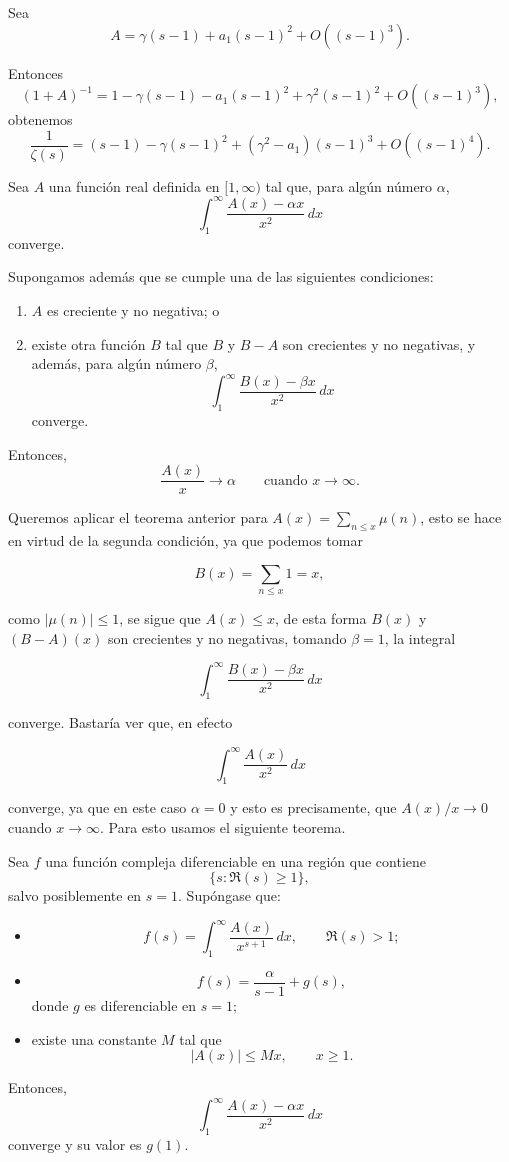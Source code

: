 \documentclass[12pt, a4paper]{article}
\begin{document}
Sea
$$
A=\gamma(s-1)+a_1(s-1)^2+O((s-1)^3).
$$

Entonces
$$
(1+A)^{-1}
=
1-\gamma(s-1)-a_1(s-1)^2+\gamma^2(s-1)^2+O((s-1)^3),
$$
obtenemos
\begin{equation}
    \frac{1}{\zeta(s)}
=
(s-1)-\gamma(s-1)^2+(\gamma^2-a_1)(s-1)^3+O((s-1)^4).
\end{equation}
\begin{theorem}
Sea $A$ una función real definida en $[1,\infty)$ tal que, para algún número $\alpha$,
\[
\int_{1}^{\infty} \frac{A(x)-\alpha x}{x^{2}}\,dx
\]
converge.

Supongamos además que se cumple una de las siguientes condiciones:
\begin{enumerate}
  \item[(i)] $A$ es creciente y no negativa; o
  \item[(ii)] existe otra función $B$ tal que $B$ y $B-A$ son crecientes y no negativas, y además, para algún número $\beta$,
  \[
  \int_{1}^{\infty} \frac{B(x)-\beta x}{x^{2}}\,dx
  \]
  converge.
\end{enumerate}

Entonces,
\[
\frac{A(x)}{x} \longrightarrow \alpha
\qquad \text{cuando } x \to \infty.
\]
\end{theorem}

Queremos aplicar el teorema anterior para $A(x)=\sum_{n\leq x} \mu(n)$, esto se hace en virtud de la segunda condición, ya que podemos tomar

$$B(x)=\sum_{n\leq x}1=x,$$

como $|\mu(n)|\leq 1$, se sigue que $A(x)\leq x$, de esta forma $B(x)$ y $(B-A)(x)$ son crecientes y no negativas, tomando $\beta=1$, la integral

\[
  \int_{1}^{\infty} \frac{B(x)-\beta x}{x^{2}}\,dx
  \]

converge. Bastaría ver que, en efecto

\[
\int_{1}^{\infty} \frac{A(x)}{x^{2}}\,dx
\]

converge, ya que en este caso $\alpha=0$ y esto es precisamente, que $A(x)/x\to 0$ cuando $x\to \infty$. Para esto usamos el siguiente teorema. 

\pagebreak

\begin{lemma}
Sea $f$ una función compleja diferenciable en una región que contiene
$$
\{ s : \Re(s) \geq 1 \},
$$
salvo posiblemente en $s = 1$. Supóngase que:

\begin{itemize}
\item[(i)]
$$
f(s) = \int_1^\infty \frac{A(x)}{x^{s+1}}\,dx, \qquad \Re(s) > 1;
$$

\item[(ii)]
$$
f(s) = \frac{\alpha}{s-1} + g(s),
$$
donde $g$ es diferenciable en $s = 1$;

\item[(iii)] existe una constante $M$ tal que
$$
|A(x)| \leq Mx, \qquad x \geq 1.
$$
\end{itemize}

Entonces,
$$
\int_1^\infty \frac{A(x) - \alpha x}{x^2}\,dx
$$
converge y su valor es $g(1)$.
\end{lemma}
\end{document}
